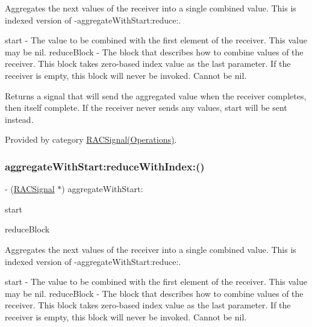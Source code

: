 Aggregates the {\ttfamily next} values of the receiver into a single combined value. This is indexed version of -\/aggregate\+With\+Start\+:reduce\+:.

start -\/ The value to be combined with the first element of the receiver. This value may be {\ttfamily nil}. reduce\+Block -\/ The block that describes how to combine values of the receiver. This block takes zero-\/based index value as the last parameter. If the receiver is empty, this block will never be invoked. Cannot be nil.

Returns a signal that will send the aggregated value when the receiver completes, then itself complete. If the receiver never sends any values, {\ttfamily start} will be sent instead. 

Provided by category \mbox{\hyperlink{category_r_a_c_signal_07_operations_08_a83c6fc367091505aa6721f1c6a58d65d}{R\+A\+C\+Signal(\+Operations)}}.

\mbox{\label{interface_r_a_c_signal_a83c6fc367091505aa6721f1c6a58d65d}} 
\subsubsection{\texorpdfstring{aggregate\+With\+Start\+:reduce\+With\+Index\+:()}{aggregateWithStart:reduceWithIndex:()}\hspace{0.1cm}{\footnotesize\ttfamily [2/3]}}
{\footnotesize\ttfamily -\/ (\mbox{\hyperlink{interface_r_a_c_signal}{R\+A\+C\+Signal}} $\ast$) aggregate\+With\+Start\+: \begin{DoxyParamCaption}\item[{(id)}]{start }\item[{reduceWithIndex:(id($^\wedge$)(id running, id next, N\+S\+U\+Integer index))}]{reduce\+Block }\end{DoxyParamCaption}}

Aggregates the {\ttfamily next} values of the receiver into a single combined value. This is indexed version of -\/aggregate\+With\+Start\+:reduce\+:.

start -\/ The value to be combined with the first element of the receiver. This value may be {\ttfamily nil}. reduce\+Block -\/ The block that describes how to combine values of the receiver. This block takes zero-\/based index value as the last parameter. If the receiver is empty, this block will never be invoked. Cannot be nil.

